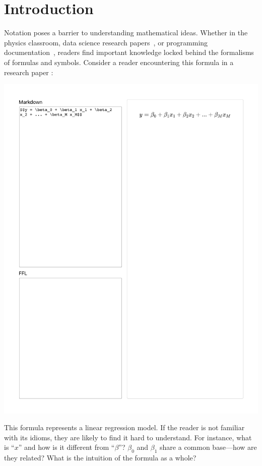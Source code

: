 \section{Introduction}

Notation poses a barrier to understanding mathematical ideas. Whether in the physics classroom, data science research papers~\cite{ref:mysore2023how}, or programming documentation~\cite{ref:cai2019software}, readers find important knowledge locked behind the formalisms of formulas and symbols. 
Consider a reader encountering this formula in a research paper \cite{ref:hohman2019gamut}:


\begin{center}
\vspace{1ex}
\includegraphics[width=0.62\linewidth]{figures/pre-aug-intro}
\end{center}
\vspace{-0.5ex}

This formula represents a linear regression model. If the reader is not familiar with its idioms, they are likely to find it hard to understand. For instance, what is ``$x$'' and how is it different from ``$\beta$''? $\beta_0$ and $\beta_1$ share a common base---how are they related? What is the intuition of the formula as a whole?


